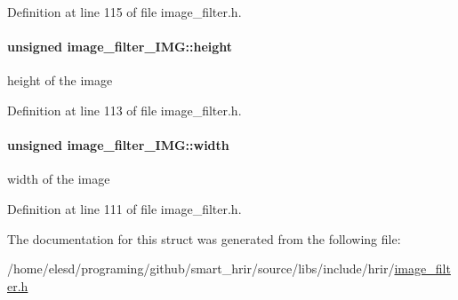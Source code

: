 Definition at line 115 of file image\-\_\-filter.\-h.

\hypertarget{a00004_a96a2da8de6bd5ff8884dc8a673b2dd8a}{
\paragraph[{height}]{\setlength{\rightskip}{0pt plus 5cm}unsigned image\-\_\-filter\-\_\-\-I\-M\-G\-::height}}\label{a00004_a96a2da8de6bd5ff8884dc8a673b2dd8a}
height of the image 

Definition at line 113 of file image\-\_\-filter.\-h.

\hypertarget{a00004_ac0b6deb570d85ea8e2fa54974b421598}{
\paragraph[{width}]{\setlength{\rightskip}{0pt plus 5cm}unsigned image\-\_\-filter\-\_\-\-I\-M\-G\-::width}}\label{a00004_ac0b6deb570d85ea8e2fa54974b421598}
width of the image 

Definition at line 111 of file image\-\_\-filter.\-h.



The documentation for this struct was generated from the following file\-:\begin{DoxyCompactItemize}
\item 
/home/elesd/programing/github/smart\-\_\-hrir/source/libs/include/hrir/\hyperlink{a00012}{image\-\_\-filter.\-h}\end{DoxyCompactItemize}
